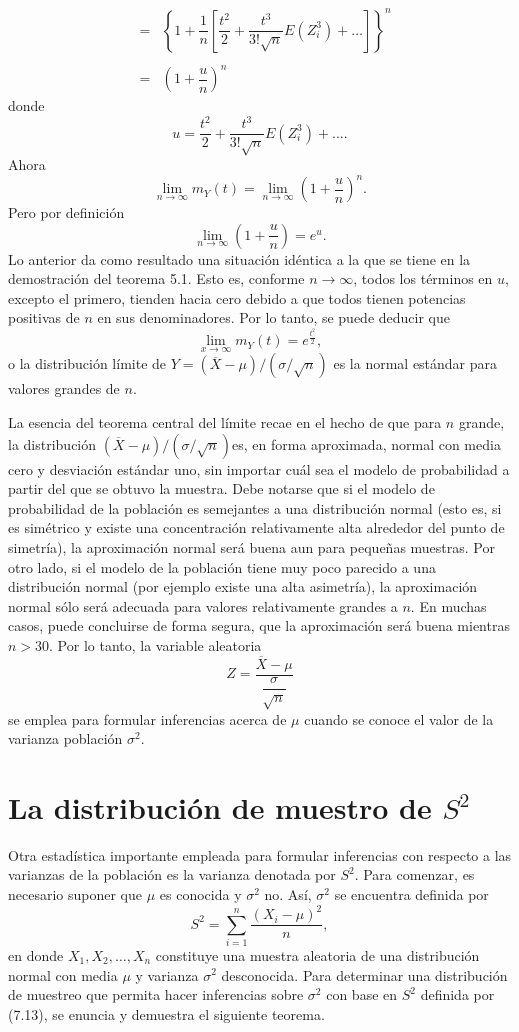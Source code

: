 \begin{teo}
$$\begin{array}{rcl}
	       &=& \left\{1+\dfrac{1}{n}\left[\dfrac{t^2}{2}+\dfrac{t^3}{3!\sqrt{n}}E\left(Z_i^3\right)+\ldots\right]\right\}^n\\\\
	       &=& \left(1+\dfrac{u}{n}\right)^n
    \end{array}
    $$
    donde
    $$u=\dfrac{t^2}{2}+\dfrac{t^3}{3!\sqrt{n}}E\left(Z_i^3\right)+\ldots.$$
    Ahora
    $$\lim_{n\to \infty}m_Y(t)=\lim_{n\to \infty}\left(1+\dfrac{u}{n}\right)^n.$$
    Pero por definición 
    $$\lim_{n\to \infty}\left(1+\dfrac{u}{n}\right)=e^u.$$
    Lo anterior da como resultado una situación idéntica a la que se tiene en la demostración del teorema 5.1. Esto es, conforme $n\to \infty$, todos los términos en $u$, excepto el primero, tienden hacia cero debido a que todos tienen potencias positivas de $n$ en sus denominadores. Por lo tanto, se puede deducir que
    $$\lim_{x\to \infty}m_Y(t)=e^{\frac{t^2}{2}},$$
    o la distribución límite de $Y=(\overline{X}-\mu)/(\sigma/\sqrt{n})$ es la normal estándar para valores grandes de $n$.
\end{teo}

La esencia del teorema central del límite recae en el hecho de que para $n$ grande, la distribución $(\overline{X}-\mu)/(\sigma/\sqrt{n})$es, en forma aproximada, normal con media cero y desviación estándar uno, sin importar cuál sea el modelo de probabilidad a partir del que se obtuvo la muestra. Debe notarse que si el modelo de probabilidad de la población es semejantes a una distribución normal (esto es, si es simétrico y existe una concentración relativamente alta alrededor del punto de simetría), la aproximación normal será buena aun para pequeñas muestras. Por otro lado, si el modelo de la población tiene muy poco parecido a una distribución normal (por ejemplo existe una alta asimetría), la aproximación normal sólo será adecuada para valores relativamente grandes a $n$. En muchas casos, puede concluirse de forma segura, que la aproximación será buena mientras $n>30$. Por lo tanto, la variable aleatoria
$$Z=\dfrac{\overline{X}-\mu}{\dfrac{\sigma}{\sqrt{n}}}$$
se emplea para formular inferencias acerca de $\mu$ cuando se conoce el valor de la varianza población $\sigma^2.$

\section{La distribución de muestro de \boldmath$S^2$}

Otra estadística importante empleada para formular inferencias con respecto a las varianzas de la población es la varianza denotada por $S^2$. Para comenzar, es necesario suponer que $\mu$ es conocida y $\sigma^2$ no. Así, $\sigma^2$ se encuentra definida por
$$S^2=\sum_{i=1}^n \dfrac{(X_i-\mu)^2}{n},$$
en donde $X_1,X_2,\ldots,X_n$ constituye una muestra aleatoria de una distribución normal con media $\mu$ y varianza $\sigma^2$ desconocida. Para determinar una distribución de muestreo que permita hacer inferencias sobre $\sigma^2$ con base en $S^2$ definida por (7.13), se enuncia y demuestra el siguiente teorema.


